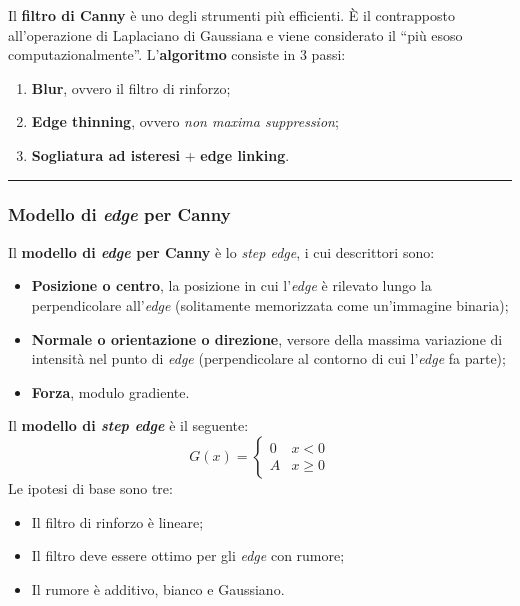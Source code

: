 \documentclass[a4paper]{article}
\newcommand{\dquotes}[1]{``#1''}
\newcommand{\longline}{\noindent\rule{\textwidth}{0.4pt}}
\begin{document}
	Il \textcolor{Red3}{\textbf{filtro di Canny}} è uno degli strumenti più efficienti. È il contrapposto all'operazione di Laplaciano di Gaussiana e viene considerato il \dquotes{più esoso computazionalmente}. L'\textbf{algoritmo} consiste in $3$ passi:
	\begin{enumerate}
		\item \textbf{Blur}, ovvero il filtro di rinforzo;
		\item \textbf{Edge thinning}, ovvero \emph{non maxima suppression};
		\item \textbf{Sogliatura ad isteresi} + \textbf{edge linking}.
	\end{enumerate}
	
	\longline
	
	\subsubsection{Modello di \emph{edge} per Canny}
	
	Il \textcolor{Red3}{\textbf{modello di \emph{edge} per Canny}} è lo \emph{step edge}, i cui descrittori sono:
	\begin{itemize}
		\item \textbf{Posizione o centro}, la posizione in cui l'\emph{edge} è rilevato lungo la perpendicolare all'\emph{edge} (solitamente memorizzata come un'immagine binaria);
		
		\item \textbf{Normale o orientazione o direzione}, versore della massima variazione di intensità nel punto di \emph{edge} (perpendicolare al contorno di cui l'\emph{edge} fa parte);
		
		\item \textbf{Forza}, modulo gradiente.
	\end{itemize}
	Il \textbf{modello di \emph{step edge}} è il seguente:
	\begin{equation*}
		G\left(x\right) = \begin{cases}
			0 & x < 0 \\
			A & x \ge 0
		\end{cases}
	\end{equation*}
	Le ipotesi di base sono tre:
	\begin{itemize}[label=-]
		\item Il filtro di rinforzo è lineare;
		\item Il filtro deve essere ottimo per gli \emph{edge} con rumore;
		\item Il rumore è additivo, bianco e Gaussiano.
	\end{itemize}
\end{document}
